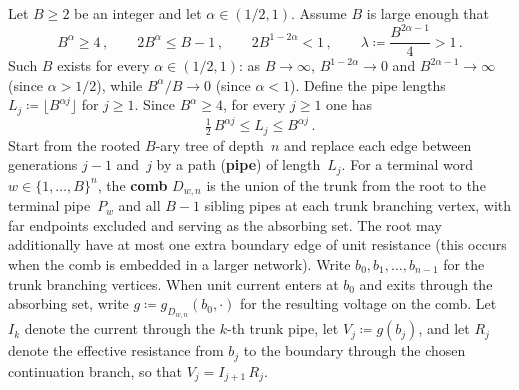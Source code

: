 \documentclass[aop]{imsart}
\theoremstyle{plain}
\theoremstyle{definition}
\begin{document}
	Let $B\geq 2$ be an integer and let $\alpha\in(1/2,1)$.  Assume $B$ is large enough that
	\begin{equation}\label{eq:comb-B-cond}
		B^{\alpha}\geq 4\,,
		\qquad
		2B^{\alpha}\leq B-1\,,
		\qquad
		2B^{1-2\alpha}<1\,,
		\qquad
		\lambda\coloneqq\frac{B^{2\alpha-1}}{4}>1\,.
	\end{equation}
	Such $B$ exists for every $\alpha\in(1/2,1)$: as $B\to\infty$, $B^{1-2\alpha}\to 0$ and $B^{2\alpha-1}\to\infty$ (since $\alpha>1/2$), while $B^{\alpha}/B\to 0$ (since $\alpha<1$).  Define the pipe lengths $L_j\coloneqq\lfloor B^{\alpha j}\rfloor$ for $j\geq 1$. Since $B^{\alpha}\geq 4$, for every $j\geq 1$ one has
	\begin{equation}\label{eq:comb-Lj-bounds}
		\tfrac{1}{2}\,B^{\alpha j}
		\leq L_j
		\leq B^{\alpha j}\,.
	\end{equation}
	Start from the rooted $B$-ary tree of depth~$n$ and replace each edge between generations $j{-}1$ and~$j$ by a path (\textbf{pipe}) of length~$L_j$.  For a terminal word $w\in\{1,\ldots,B\}^n$, the \textbf{comb} $D_{w,n}$ is the union of the trunk from the root to the terminal pipe~$P_w$ and all $B{-}1$ sibling pipes at each trunk branching vertex, with far endpoints excluded and serving as the absorbing set.  The root may additionally have at most one extra boundary edge of unit resistance (this occurs when the comb is embedded in a larger network).
	Write $b_0,b_1,\ldots,b_{n-1}$ for the trunk branching vertices.  When unit current enters at $b_0$ and exits through the absorbing set, write $g\coloneqq g_{D_{w,n}}(b_0,\cdot)$ for the resulting voltage on the comb.  Let $I_k$ denote the current through the $k$-th trunk pipe, let $V_j\coloneqq g(b_j)$, and let $R_j$ denote the effective resistance from $b_j$ to the boundary through the chosen continuation branch, so that $V_j=I_{j+1}\,R_j$.
	
\end{document}
